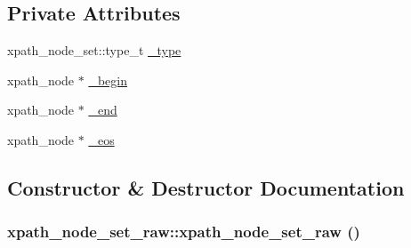 \subsection*{Private Attributes}
\begin{DoxyCompactItemize}
\item 
xpath\_\-node\_\-set::type\_\-t \hyperlink{classxpath__node__set__raw_a00a164066aff1d6075631b2532ed9713}{\_\-type}
\item 
xpath\_\-node $\ast$ \hyperlink{classxpath__node__set__raw_a8e6071473610e8340b07a64767ef68c0}{\_\-begin}
\item 
xpath\_\-node $\ast$ \hyperlink{classxpath__node__set__raw_af8435774146a65edee6cf320dbb8930f}{\_\-end}
\item 
xpath\_\-node $\ast$ \hyperlink{classxpath__node__set__raw_a886a925457f162fe38483da1d57b9b56}{\_\-eos}
\end{DoxyCompactItemize}


\subsection{Constructor \& Destructor Documentation}
\hypertarget{classxpath__node__set__raw_ae849a23893eef70c01197feaf5c07544}{
\subsubsection[{xpath\_\-node\_\-set\_\-raw}]{\setlength{\rightskip}{0pt plus 5cm}xpath\_\-node\_\-set\_\-raw::xpath\_\-node\_\-set\_\-raw ()}}
\label{classxpath__node__set__raw_ae849a23893eef70c01197feaf5c07544}


